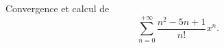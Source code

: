 \begin{enonce}
\begin{exercise}[ID={RMS123 E1010, CCP PSI},subtitle={},tags={}, difficulty={0}]
Convergence et calcul de
\begin{equation*}
  \sum_{n=0}^{+\infty} \frac{n^2-5n+1}{n!} x^n.
\end{equation*}
\end{exercise}
\begin{solution}
\end{solution}
\end{enonce}
